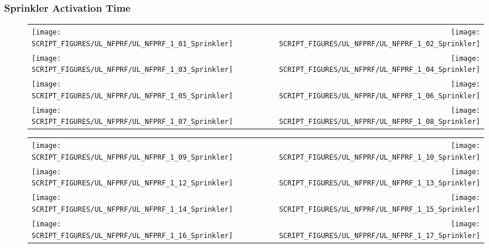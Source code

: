 \clearpage

\subsubsection{Sprinkler Activation Time}

\begin{figure}[!ht]
\begin{tabular*}{\textwidth}{l@{\extracolsep{\fill}}r}
\texttt{[image: SCRIPT\_FIGURES/UL\_NFPRF/UL\_NFPRF\_1\_01\_Sprinkler]} &
\texttt{[image: SCRIPT\_FIGURES/UL\_NFPRF/UL\_NFPRF\_1\_02\_Sprinkler]} \\
\texttt{[image: SCRIPT\_FIGURES/UL\_NFPRF/UL\_NFPRF\_1\_03\_Sprinkler]} &
\texttt{[image: SCRIPT\_FIGURES/UL\_NFPRF/UL\_NFPRF\_1\_04\_Sprinkler]} \\
\texttt{[image: SCRIPT\_FIGURES/UL\_NFPRF/UL\_NFPRF\_1\_05\_Sprinkler]} &
\texttt{[image: SCRIPT\_FIGURES/UL\_NFPRF/UL\_NFPRF\_1\_06\_Sprinkler]} \\
\texttt{[image: SCRIPT\_FIGURES/UL\_NFPRF/UL\_NFPRF\_1\_07\_Sprinkler]} &
\texttt{[image: SCRIPT\_FIGURES/UL\_NFPRF/UL\_NFPRF\_1\_08\_Sprinkler]}
\end{tabular*}
\end{figure}

\begin{figure}[!ht]
\begin{tabular*}{\textwidth}{l@{\extracolsep{\fill}}r}
\texttt{[image: SCRIPT\_FIGURES/UL\_NFPRF/UL\_NFPRF\_1\_09\_Sprinkler]} &
\texttt{[image: SCRIPT\_FIGURES/UL\_NFPRF/UL\_NFPRF\_1\_10\_Sprinkler]} \\
\texttt{[image: SCRIPT\_FIGURES/UL\_NFPRF/UL\_NFPRF\_1\_12\_Sprinkler]} &
\texttt{[image: SCRIPT\_FIGURES/UL\_NFPRF/UL\_NFPRF\_1\_13\_Sprinkler]} \\
\texttt{[image: SCRIPT\_FIGURES/UL\_NFPRF/UL\_NFPRF\_1\_14\_Sprinkler]} &
\texttt{[image: SCRIPT\_FIGURES/UL\_NFPRF/UL\_NFPRF\_1\_15\_Sprinkler]} \\
\texttt{[image: SCRIPT\_FIGURES/UL\_NFPRF/UL\_NFPRF\_1\_16\_Sprinkler]} &
\texttt{[image: SCRIPT\_FIGURES/UL\_NFPRF/UL\_NFPRF\_1\_17\_Sprinkler]}
\end{tabular*}
\end{figure}

